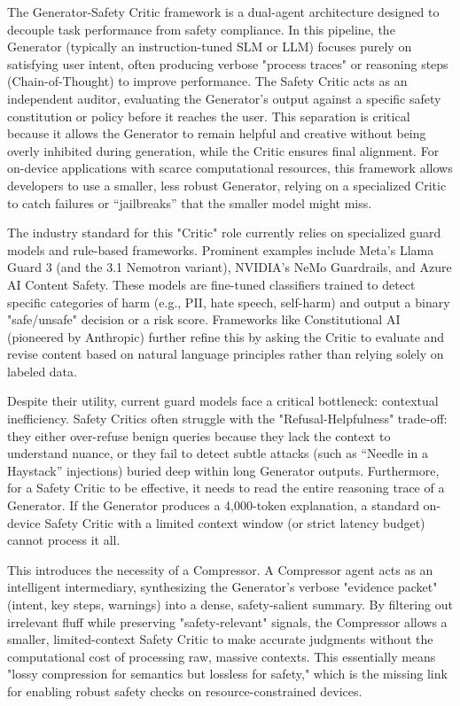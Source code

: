 \documentclass[11pt]{article}
\begin{document}
The Generator-Safety Critic framework is a dual-agent architecture designed to decouple task performance from safety compliance. In this pipeline, the Generator (typically an instruction-tuned SLM or LLM) focuses purely on satisfying user intent, often producing verbose "process traces" or reasoning steps (Chain-of-Thought) to improve performance. The Safety Critic acts as an independent auditor, evaluating the Generator’s output against a specific safety constitution or policy before it reaches the user. This separation is critical because it allows the Generator to remain helpful and creative without being overly inhibited during generation, while the Critic ensures final alignment. For on-device applications with scarce computational resources, this framework allows developers to use a smaller, less robust Generator, relying on a specialized Critic to catch failures or “jailbreaks” that the smaller model might miss.

The industry standard for this "Critic" role currently relies on specialized guard models and rule-based frameworks. Prominent examples include Meta’s Llama Guard 3 (and the 3.1 Nemotron variant), NVIDIA’s NeMo Guardrails, and Azure AI Content Safety. These models are fine-tuned classifiers trained to detect specific categories of harm (e.g., PII, hate speech, self-harm) and output a binary "safe/unsafe" decision or a risk score. Frameworks like Constitutional AI (pioneered by Anthropic) further refine this by asking the Critic to evaluate and revise content based on natural language principles rather than relying solely on labeled data.

Despite their utility, current guard models face a critical bottleneck: contextual inefficiency. Safety Critics often struggle with the "Refusal-Helpfulness" trade-off: they either over-refuse benign queries because they lack the context to understand nuance, or they fail to detect subtle attacks (such as “Needle in a Haystack” injections) buried deep within long Generator outputs. Furthermore, for a Safety Critic to be effective, it needs to read the entire reasoning trace of a Generator. If the Generator produces a 4,000-token explanation, a standard on-device Safety Critic with a limited context window (or strict latency budget) cannot process it all.

This introduces the necessity of a Compressor. A Compressor agent acts as an intelligent intermediary, synthesizing the Generator’s verbose "evidence packet" (intent, key steps, warnings) into a dense, safety-salient summary. By filtering out irrelevant fluff while preserving "safety-relevant" signals, the Compressor allows a smaller, limited-context Safety Critic to make accurate judgments without the computational cost of processing raw, massive contexts. This essentially means "lossy compression for semantics but lossless for safety," which is the missing link for enabling robust safety checks on resource-constrained devices.
\end{document}
